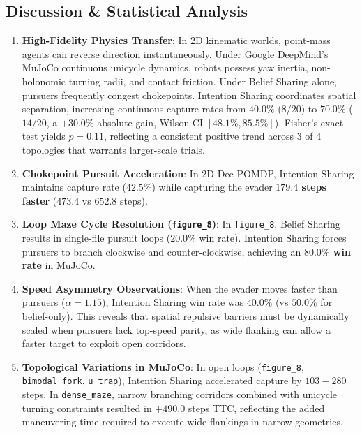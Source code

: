 \documentclass[conference]{IEEEtran}
\begin{document}
\subsection{Discussion \& Statistical Analysis}
\begin{enumerate}
    \item \textbf{High-Fidelity Physics Transfer}: In 2D kinematic worlds, point-mass agents can reverse direction instantaneously. Under Google DeepMind's MuJoCo continuous unicycle dynamics, robots possess yaw inertia, non-holonomic turning radii, and contact friction. Under Belief Sharing alone, pursuers frequently congest chokepoints. Intention Sharing coordinates spatial separation, increasing continuous capture rates from $40.0\%$ ($8/20$) to $\mathbf{70.0\%}$ ($14/20$, a $+30.0\%$ absolute gain, Wilson CI $[48.1\%, 85.5\%]$). Fisher's exact test yields $p = 0.11$, reflecting a consistent positive trend across 3 of 4 topologies that warrants larger-scale trials.
    \item \textbf{Chokepoint Pursuit Acceleration}: In 2D Dec-POMDP, Intention Sharing maintains capture rate ($42.5\%$) while capturing the evader \textbf{$179.4$ steps faster} ($473.4$ vs $652.8$ steps).
    \item \textbf{Loop Maze Cycle Resolution (\texttt{figure\_8})}: In \texttt{figure\_8}, Belief Sharing results in single-file pursuit loops ($20.0\%$ win rate). Intention Sharing forces pursuers to branch clockwise and counter-clockwise, achieving an \textbf{$80.0\%$ win rate} in MuJoCo.
    \item \textbf{Speed Asymmetry Observations}: When the evader moves faster than pursuers ($\alpha=1.15$), Intention Sharing win rate was $40.0\%$ (vs $50.0\%$ for belief-only). This reveals that spatial repulsive barriers must be dynamically scaled when pursuers lack top-speed parity, as wide flanking can allow a faster target to exploit open corridors.
    \item \textbf{Topological Variations in MuJoCo}: In open loops (\texttt{figure\_8}, \texttt{bimodal\_fork}, \texttt{u\_trap}), Intention Sharing accelerated capture by $103-280$ steps. In \texttt{dense\_maze}, narrow branching corridors combined with unicycle turning constraints resulted in $+490.0$ steps TTC, reflecting the added maneuvering time required to execute wide flankings in narrow geometries.
\end{enumerate}

\end{document}

